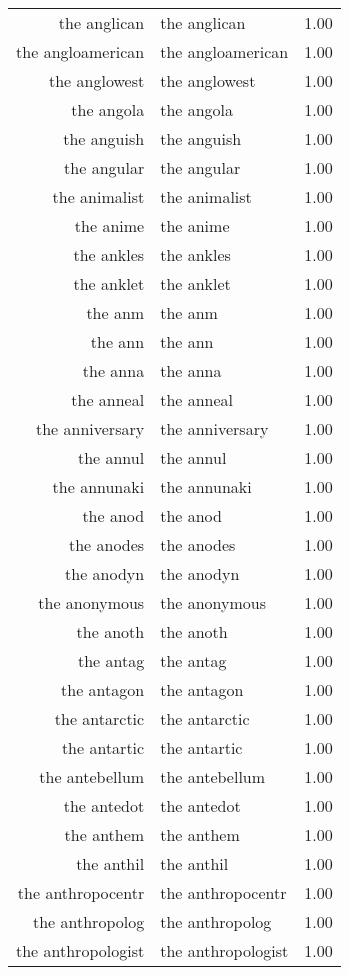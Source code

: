 \begin{table}[ht]
\begin{tabular}{rlr}
  the anglican & the anglican & 1.00 \\ 
  the angloamerican & the angloamerican & 1.00 \\ 
  the anglowest & the anglowest & 1.00 \\ 
  the angola & the angola & 1.00 \\ 
  the anguish & the anguish & 1.00 \\ 
  the angular & the angular & 1.00 \\ 
  the animalist & the animalist & 1.00 \\ 
  the anime & the anime & 1.00 \\ 
  the ankles & the ankles & 1.00 \\ 
  the anklet & the anklet & 1.00 \\ 
  the anm & the anm & 1.00 \\ 
  the ann & the ann & 1.00 \\ 
  the anna & the anna & 1.00 \\ 
  the anneal & the anneal & 1.00 \\ 
  the anniversary & the anniversary & 1.00 \\ 
  the annul & the annul & 1.00 \\ 
  the annunaki & the annunaki & 1.00 \\ 
  the anod & the anod & 1.00 \\ 
  the anodes & the anodes & 1.00 \\ 
  the anodyn & the anodyn & 1.00 \\ 
  the anonymous & the anonymous & 1.00 \\ 
  the anoth & the anoth & 1.00 \\ 
  the antag & the antag & 1.00 \\ 
  the antagon & the antagon & 1.00 \\ 
  the antarctic & the antarctic & 1.00 \\ 
  the antartic & the antartic & 1.00 \\ 
  the antebellum & the antebellum & 1.00 \\ 
  the antedot & the antedot & 1.00 \\ 
  the anthem & the anthem & 1.00 \\ 
  the anthil & the anthil & 1.00 \\ 
  the anthropocentr & the anthropocentr & 1.00 \\ 
  the anthropolog & the anthropolog & 1.00 \\ 
  the anthropologist & the anthropologist & 1.00 \\ 

\end{tabular}
\end{table}
